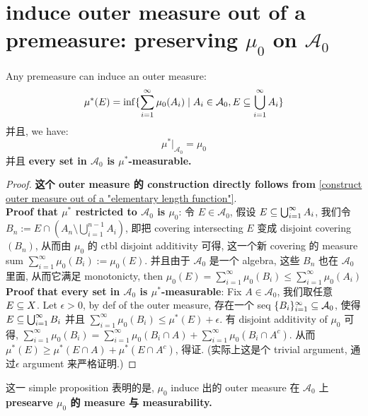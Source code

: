 \documentclass[lang=cn,11pt]{elegantbook}
\begin{document}
\section{induce outer measure out of a premeasure: preserving $\mu_0$ on $\mathcal{A}_0$}
\begin{proposition}
\label{construct outer measure out of a premeasure}
    Any premeasure can induce an outer measure:
    \begin{equation}
        \mu^*(E) = \inf \{  \sum_{i=1}^\infty \mu_0(A_i) \mid A_i \in \mathcal{A}_0, E \subseteq \bigcup_{i=1}^\infty A_i   \}
    \end{equation}
    并且, we have:
    \begin{equation}
        \mu^*|_{\mathcal{A}_0} = \mu_0
    \end{equation}
    并且 \textbf{every set in $\mathcal{A}_0$ is $\mu^*$-measurable.}
\end{proposition}
\begin{proof}
    \textbf{这个 outer measure 的 construction directly follows from} \ref{construct outer measure out of a "elementary length function"}.\\
    \noindent \textbf{Proof that $\mu^*$ restricted to $\mathcal{A}_0$ is $\mu_0$}: 令 $E \in \mathcal{A}_0$, 假设 $E \subseteq \bigcup_{i=1}^\infty A_i$, 我们令 $B_n := E \cap (A_n \setminus \bigcup_{i=1}^{n-1} A_i)$, 即把 covering intersecting $E$ 变成 disjoint covering $(B_n)$, 从而由 $\mu_0$ 的 ctbl disjoint additivity 可得, 这一个新 covering 的 measure sum $\sum_{i=1}^\infty \mu_0(B_i) := \mu_0(E)$. 并且由于 $\mathcal{A}_0$ 是一个 algebra, 这些 $B_n$ 也在 $\mathcal{A}_0$ 里面, 从而它满足 monotonicty, then $\mu_0(E) = \sum_{i=1}^\infty \mu_0(B_i) \leq \sum_{i=1}^\infty \mu_0(A_i) $\\
    \noindent \textbf{Proof that every set in $\mathcal{A}_0$ is $\mu^*$-measurable}: Fix $A \in \mathcal{A}_0$, 我们取任意 $E \subseteq X$.
    Let $\epsilon > 0$, by def of the outer measure, 存在一个 seq $\{ B_i\}_{i=1}^\infty \subseteq \mathcal{A}_0$, 使得 $E \subseteq \bigcup_{i=1}^\infty B_i$ 并且 $\sum_{i=1}^\infty \mu_0(B_i) \leq \mu^*(E) + \epsilon$. 有 disjoint additivity of $\mu_0$ 可得, $\sum_{i=1}^\infty \mu_0(B_i) = \sum_{i=1}^\infty \mu_0(B_i \cap A) + \sum_{i=1}^\infty \mu_0(B_i\cap A^c)$. 从而 $\mu^*(E) \geq \mu^*(E \cap A) + \mu^*(E\cap A^c)$, 得证. (实际上这是个 trivial argument, 通过$\epsilon$ argument 来严格证明.)
\end{proof}
\begin{remark}
    这一 simple proposition 表明的是, $\mu_0$ induce 出的 outer measure 在 $\mathcal{A}_0$ 上 \textbf{presearve $\mu_0$ 的 measure 与 measurability.}
\end{remark}
\end{document}

